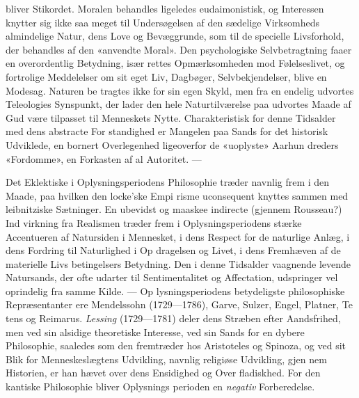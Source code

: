 \documentclass[12pt,a4paper]{book}
\begin{document}
bliver Stikordet. Moralen behandles ligeledes eudaimonistisk,
og Interessen knytter sig ikke saa meget til Undersøgelsen af
den sædelige Virksomheds almindelige Natur, dens Love og
Bevæggrunde, som til de specielle Livsforhold, der behandles
af den «anvendte Moral». Den psychologiske Selvbetragtning
faaer en overordentlig Betydning, især rettes Opmærksomheden
mod Følelseslivet, og fortrolige Meddelelser om sit eget Liv,
Dagbøger, Selvbekjendelser, blive en Modesag. Naturen be\-%
tragtes ikke for sin egen Skyld, men fra en endelig udvortes
Teleologies Synspunkt, der lader den hele Naturtilværelse paa
udvortes Maade af Gud være tilpasset til Menneskets Nytte.
Charakteristisk for denne Tidsalder med dens abstracte For\-%
standighed er Mangelen paa Sands for det historisk Udviklede,
en bornert Overlegenhed ligeoverfor de «uoplyste» Aarhun\-%
dreders «Fordomme», en Forkasten af al Autoritet. ---

Det Eklektiske i Oplysningsperiodens Philosophie træder
navnlig frem i den Maade, paa hvilken den locke'ske Empi\-%
risme uconsequent knyttes sammen med leibnitziske Sætninger.
En ubevidst og maaskee indirecte (gjennem Rousseau?) Ind\-%
virkning fra Realismen træder frem i Oplysningsperiodens
stærke Accentueren af Natursiden i Mennesket, i dens Respect
for de naturlige Anlæg, i dens Fordring til Naturlighed i Op\-%
dragelsen og Livet, i dens Fremhæven af de materielle Livs\-%
betingelsers Betydning. Den i denne Tidsalder vaagnende
levende Natursands, der ofte udarter til Sentimentalitet og
Affectation, udspringer vel oprindelig fra samme Kilde. --- Op\-%
lysningsperiodens betydeligste philosophiske Repræsentanter ere
Mendelssohn (1729---1786), Garve, Sulzer, Engel, Platner, Te\-%
tens og Reimarus. \emph{Lessing} (1729---1781) deler dens Stræben
efter Aandsfrihed, men ved sin alsidige theoretiske Interesse,
ved sin Sands for en dybere Philosophie, saaledes som den
fremtræder hos Aristoteles og Spinoza, og ved sit Blik for
Menneskeslægtens Udvikling, navnlig religiøse Udvikling, gjen\-%
nem Historien, er han hævet over dens Ensidighed og Over\-%
fladiskhed. For den kantiske Philosophie bliver Oplysnings\-%
perioden en \emph{negativ} Forberedelse.
\end{document}
